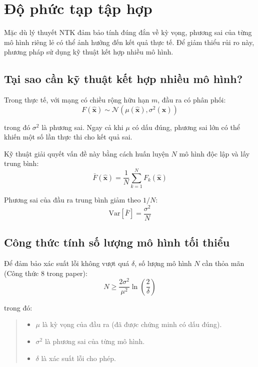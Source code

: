 \section{Độ phức tạp tập hợp}

Mặc dù lý thuyết NTK đảm bảo tính đúng đắn về kỳ vọng, phương sai của từng mô hình riêng lẻ có thể ảnh hưởng đến kết quả thực tế. Để giảm thiểu rủi ro này, phương pháp sử dụng kỹ thuật kết hợp nhiều mô hình.

\subsection{Tại sao cần kỹ thuật kết hợp nhiều mô hình?}

Trong thực tế, với mạng có chiều rộng hữu hạn $m$, đầu ra có phân phối:
\begin{equation}
    F(\hat{\mathbf{x}}) \sim \mathcal{N}(\mu(\hat{\mathbf{x}}), \sigma^2(\hat{\mathbf{x}}))
\end{equation}

trong đó $\sigma^2$ là phương sai. Ngay cả khi $\mu$ có dấu đúng, phương sai lớn có thể khiến một số lần thực thi cho kết quả sai.

\vspace{0.2cm}

Kỹ thuật giải quyết vấn đề này bằng cách huấn luyện $N$ mô hình độc lập và lấy trung bình:
\begin{equation}
    \bar{F}(\hat{\mathbf{x}}) = \frac{1}{N} \sum_{k=1}^{N} F_k(\hat{\mathbf{x}})
\end{equation}

Phương sai của đầu ra trung bình giảm theo $1/N$:
\begin{equation}
    \text{Var}[\bar{F}] = \frac{\sigma^2}{N}
\end{equation}

\subsection{Công thức tính số lượng mô hình tối thiểu}

Để đảm bảo xác suất lỗi không vượt quá $\delta$, số lượng mô hình $N$ cần thỏa mãn (Công thức 8 trong paper):
\begin{equation}
    N \geq \frac{2\sigma^2}{\mu^2} \ln\left(\frac{2}{\delta}\right)
\end{equation}

trong đó:
\begin{quote}
\begin{itemize}
    \item $\mu$ là kỳ vọng của đầu ra (đã được chứng minh có dấu đúng).
    \item $\sigma^2$ là phương sai của từng mô hình.
    \item $\delta$ là xác suất lỗi cho phép.
\end{itemize}
\end{quote}

